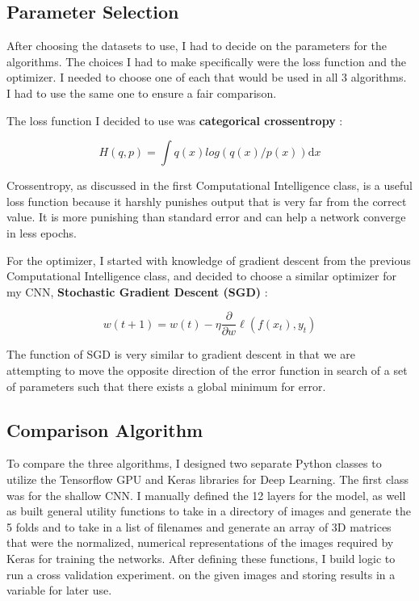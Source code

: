 \documentclass[12pt]{article}
\begin{document}
	\subsection{Parameter Selection}
After choosing the datasets to use, I had to decide on the parameters for the algorithms. The choices I had to make specifically were the loss function and the optimizer. I needed to choose one of each that would be used in all 3 algorithms. I had to use the same one to ensure a fair comparison. 

The loss function I decided to use was \textbf{categorical crossentropy} \cite{cross_entropy}: 
		
\[
		H(q,p) =  \int q(x) log(q(x) / p(x)) \mathrm{d}x
\]

Crossentropy, as discussed in the first Computational Intelligence class, is a useful loss function because it harshly punishes output that is very far from the correct value. It is more punishing than standard error and can help a network converge in less epochs. 

For the optimizer, I started with knowledge of gradient descent from the previous Computational Intelligence class, and decided to choose a similar optimizer for my CNN, \textbf{Stochastic Gradient Descent (SGD)} \cite{sgd}:

\[
	w(t+1) = w(t) - \eta \frac{\partial}{\partial w} \ell(f(x_t), y_t)
\]

The function of SGD is very similar to gradient descent in that we are attempting to move the opposite direction of the error function in search of a set of parameters such that there exists a global minimum for error.

	\subsection{Comparison Algorithm}
	
To compare the three algorithms, I designed two separate Python classes to utilize the Tensorflow GPU and Keras libraries for Deep Learning. The first class was for the shallow CNN. I manually defined the 12 layers for the model, as well as built general utility functions to take in a directory of images and generate the 5 folds and to take in a list of filenames and generate an array of 3D matrices that were the normalized, numerical representations of the images required by Keras for training the networks. After defining these functions, I build logic to run a cross validation experiment. on the given images and storing results in a variable for later use.
\end{document}
